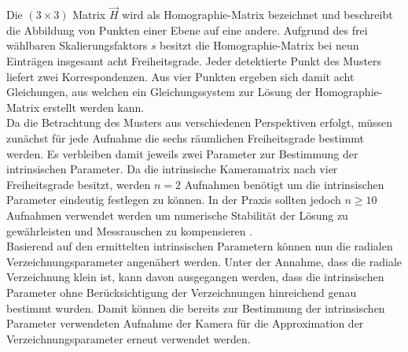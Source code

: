Die $(3 \times 3)$ Matrix $\vec{H}$ wird als Homographie-Matrix bezeichnet und beschreibt die Abbildung von Punkten einer Ebene auf eine andere. Aufgrund des frei wählbaren Skalierungsfaktors $s$ besitzt die Homographie-Matrix bei neun Einträgen insgesamt acht Freiheitsgrade. Jeder detektierte Punkt des Musters liefert zwei Korrespondenzen. Aus vier Punkten ergeben sich damit acht Gleichungen, aus welchen ein Gleichungssystem zur Lösung der Homographie-Matrix erstellt werden kann.\\

Da die Betrachtung des Musters aus verschiedenen Perspektiven erfolgt, müssen zunächst für jede Aufnahme die sechs räumlichen Freiheitsgrade bestimmt werden. Es verbleiben damit jeweils zwei Parameter zur Bestimmung der intrinsischen Parameter. Da die intrinsische Kameramatrix nach  vier Freiheitsgrade besitzt, werden $n = 2$ Aufnahmen benötigt um die intrinsischen Parameter eindeutig festlegen zu können. In der Praxis sollten jedoch $n \geq 10$ Aufnahmen verwendet werden um numerische Stabilität der Lösung zu gewährleisten und Messrauschen zu kompensieren \cite{Bradsky2008}.\\


Basierend auf den ermittelten intrinsischen Parametern können nun die radialen Verzeichnungsparameter angenähert werden. Unter der Annahme, dass die radiale Verzeichnung klein ist, kann davon ausgegangen werden, dass die intrinsischen Parameter ohne Berücksichtigung der Verzeichnungen hinreichend genau bestimmt wurden. Damit können die bereits zur Bestimmung der intrinsischen Parameter verwendeten Aufnahme der Kamera für die Approximation der Verzeichnungsparameter erneut verwendet werden.\\

